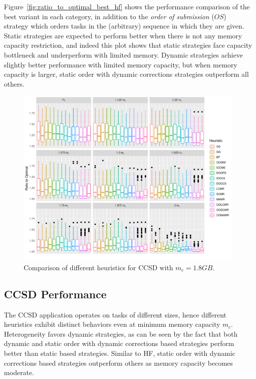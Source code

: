 \documentclass[runningheads]{llncs} %
\begin{document}
Figure~\ref{fig:ratio_to_optimal_best_hf} shows the performance comparison of the best variant in each category, in addition to the \textit{order of submission} ($OS$) strategy which orders tasks in the (arbitrary) sequence in which they are given. Static strategies are expected to perform better when there is not any memory capacity restriction, and indeed this plot shows that static strategies face capacity bottleneck and underperform with limited memory. Dynamic strategies achieve slightly better performance with limited memory capacity, but when memory capacity is larger, static order with dynamic corrections strategies outperform all others.
		\begin{figure}[htb]
		\begin{center}
			\includegraphics[scale=0.5]{./ratio_to_optimal_ccsd.pdf}
			\caption{Comparison of different heuristics for CCSD with $m_c=1.8GB$.}
			\label{fig:ratio_to_optimal_ccsd}
	\end{center}
	\end{figure}	
	
	\subsection{CCSD Performance}

	
		The CCSD application operates on tasks of different sizes, hence different heuristics exhibit distinct behaviors even at minimum memory capacity $m_c$. Heterogeneity favors dynamic strategies, as can be seen by the fact that both dynamic and static order with dynamic corrections based strategies perform better than static based strategies. Similar to HF, static order with dynamic corrections based strategies outperform others as memory capacity becomes moderate.  
	
\end{document}
